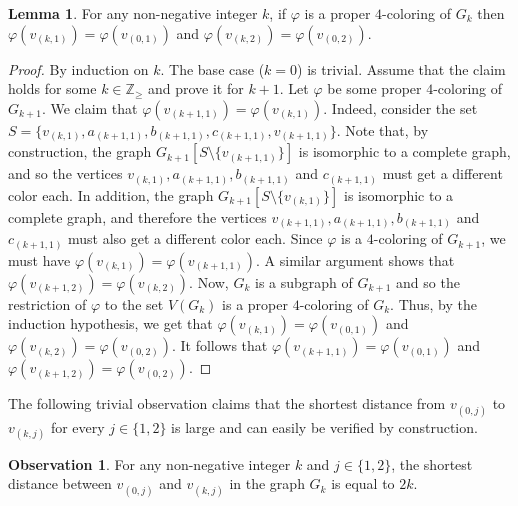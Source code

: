 \documentclass{article}
\theoremstyle{definition}
\newtheorem{lemma}{Lemma}[section]
\newtheorem{observation}{Observation}[section]
\def \Z {{\mathbb Z}}
\begin{document}
\begin{lemma} For any non-negative integer $k$, if $\varphi$ is a proper $4$-coloring of $G_k$ then $\varphi(v_{(k,1)}) = \varphi(v_{(0,1)})$ and $\varphi(v_{(k,2)}) = \varphi(v_{(0,2)})$.\label{lem:distanceColor}\end{lemma}

\begin{proof} By induction on $k$. The base case ($k = 0$) is trivial. Assume that the claim holds for some $k \in \Z_{\ge}$ and prove it for $k+1$. Let $\varphi$ be some proper $4$-coloring of $G_{k+1}$. We claim that $\varphi(v_{(k+1,1)}) = \varphi(v_{(k,1)})$. Indeed, consider the set $S = \{v_{(k,1)},a_{(k+1,1)},b_{(k+1,1)},c_{(k+1,1)},v_{(k+1,1)}\}$. %
Note that, by construction, the graph $G_{k+1}[S\setminus\{v_{(k+1,1)}\}]$ is isomorphic to a complete graph, and so the vertices
$v_{(k,1)},a_{(k+1,1)},b_{(k+1,1)}$ and $c_{(k+1,1)}$ must get a different color each.
In addition, the graph $G_{k+1}[S\setminus\{v_{(k,1)}\}]$  is isomorphic to a complete graph, and therefore
the vertices
$v_{(k+1,1)},a_{(k+1,1)},b_{(k+1,1)}$ and $c_{(k+1,1)}$ must also get a different color each. Since $\varphi$ is a $4$-coloring of $G_{k+1}$, we must have $\varphi(v_{(k,1)}) = \varphi(v_{(k+1,1)})$.
A similar argument shows that $\varphi(v_{(k+1,2)}) = \varphi(v_{(k,2)})$. Now, $G_k$ is a subgraph of $G_{k+1}$ and so the restriction of $\varphi$ to the set $V(G_k)$ is a proper $4$-coloring of $G_k$. Thus, by the induction hypothesis, we get that $\varphi(v_{(k,1)}) = \varphi(v_{(0,1)})$ and $\varphi(v_{(k,2)}) = \varphi(v_{(0,2)})$. It follows that $\varphi(v_{(k+1,1)}) = \varphi(v_{(0,1)})$ and $\varphi(v_{(k+1,2)}) = \varphi(v_{(0,2)})$.\end{proof}

The following trivial observation claims that the shortest distance from $v_{(0,j)}$ to $v_{(k,j)}$ for every $j \in \{1,2\}$ is large and can easily be verified by construction.

\begin{observation} For any non-negative integer $k$ and $j \in \{1,2\}$, the shortest distance between $v_{(0,j)}$ and $v_{(k,j)}$ in the graph $G_{k}$ is equal to $2k$. \label{lem:longDis}\end{observation}
\end{document}
